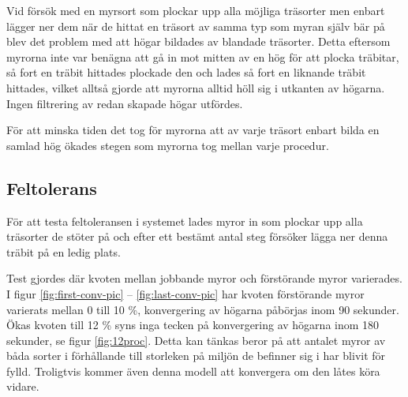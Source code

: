 \documentclass[titlepage, a4paper, 12pt]{article}
\begin{document}
Vid försök med en myrsort som plockar upp alla möjliga träsorter men
enbart lägger ner dem när de hittat en träsort av samma typ som myran
själv bär på blev det problem med att högar bildades av blandade
träsorter. Detta eftersom myrorna inte var benägna att gå in mot
mitten av en hög för att plocka träbitar, så fort en träbit hittades
plockade den och lades så fort en liknande träbit hittades, vilket
alltså gjorde att myrorna alltid höll sig i utkanten av högarna. Ingen
filtrering av redan skapade högar utfördes.

För att minska tiden det tog för myrorna att av varje träsort enbart
bilda en samlad hög ökades stegen som myrorna tog mellan varje
procedur.

\subsection{Feltolerans}


För att testa feltoleransen i systemet lades myror in som plockar upp
alla träsorter de stöter på och efter ett bestämt antal steg försöker
lägga ner denna träbit på en ledig plats.

Test gjordes där kvoten mellan jobbande myror och förstörande myror
varierades.  I figur \ref{fig:first-conv-pic} –
\ref{fig:last-conv-pic} har kvoten förstörande myror varierats mellan
0 till 10 \%, konvergering av högarna påbörjas inom 90 sekunder. Ökas
kvoten till 12 \% syns inga tecken på konvergering av högarna inom 180
sekunder, se figur \ref{fig:12proc}. Detta kan tänkas beror på att
antalet myror av båda sorter i förhållande till storleken på miljön de
befinner sig i har blivit för fylld. Troligtvis kommer även denna
modell att konvergera om den låtes köra vidare.
\end{document}
